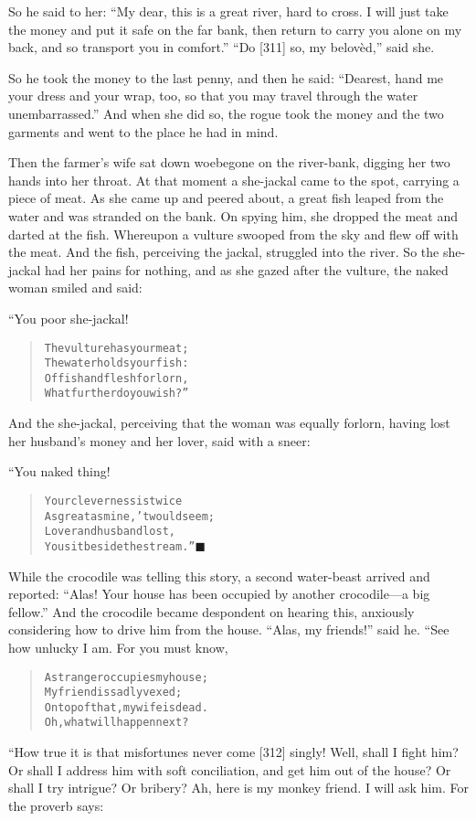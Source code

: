 \documentclass[article, twoside, 14pt]{memoir}
\newcommand{\qed}{\hfill \ensuremath{\blacksquare}}
\renewenvironment{verbatim}{%
\begin{quote}%
\vskip -10pt%
\begin{alltt}\normalfont\large}{\end{alltt}%
\end{quote}%
\vskip -10pt
} %
\begin{document}
So he said to her:
``My dear, this is a great river, hard to cross. I will just take the money and put it safe on the far bank, then return to carry you alone on my back, and so transport you in comfort.''
``Do [311] so, my belovèd,'' said she.

So he took the money to the last penny, and then he said:
``Dearest, hand me your dress and your wrap, too, so that you may travel through the water unembarrassed.''
And when she did so, the rogue took the money and the two garments
and went to the place he had in mind.

Then the farmer's wife sat down woebegone on the river-bank,
digging her two hands into her throat. At that moment a she-jackal
came to the spot, carrying a piece of meat. As she came up and
peered about, a great fish leaped from the water and was stranded
on the bank. On spying him, she dropped the meat and darted at the
fish. Whereupon a vulture swooped from the sky and flew off with
the meat. And the fish, perceiving the jackal, struggled into the
river. So the she-jackal had her pains for nothing, and as she
gazed after the vulture, the naked woman smiled and said:

“You poor she-jackal!

\begin{verbatim}
The vulture has your meat;
    The water holds your fish:
Of fish and flesh forlorn,
    What further do you wish?”
\end{verbatim}
And the she-jackal, perceiving that the woman was equally forlorn,
having lost her husband's money and her lover, said with a sneer:

“You naked thing!

\begin{verbatim}
Your cleverness is twice
    As great as mine, 'twould seem;
Lover and husband lost,
    You sit beside the stream.”\hyperref[s74]{\qed}
\end{verbatim}
While the crocodile was telling this story, a second water-beast
arrived and reported:
``Alas! Your house has been occupied by another crocodile---a big fellow.''
And the crocodile became despondent on hearing this, anxiously
considering how to drive him from the house. ``Alas, my friends!''
said he. “See how unlucky I am. For you must know,

\begin{verbatim}
A stranger occupies my house;
    My friend is sadly vexed;
On top of that, my wife is dead.
    Oh, what will happen next?
\end{verbatim}
“How true it is that misfortunes never come [312] singly! Well,
shall I fight him? Or shall I address him with soft conciliation,
and get him out of the house? Or shall I try intrigue? Or bribery?
Ah, here is my monkey friend. I will ask him. For the proverb
says:
\end{document}
